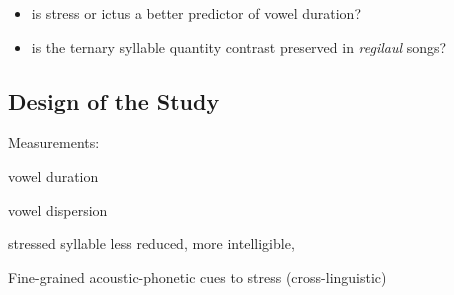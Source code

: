 

 
 
\begin{itemize}
\item is stress or ictus a better predictor of vowel duration?
\item is the ternary syllable quantity contrast preserved in {\it regilaul} songs?
\end{itemize} 

\subsection{Design of the Study}

Measurements:

vowel duration

vowel dispersion

stressed syllable less reduced, more intelligible, 

Fine-grained acoustic-phonetic cues to stress (cross-linguistic) 
\citep{lindblom1990,moonInteractionDurationContext1994, de1995supraglottal, bradlowIntelligibilityNormalSpeech1996,smiljanicProductionPerceptionClear2005} \\
